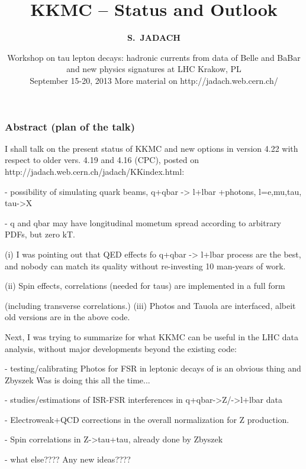 \documentclass{beamer}
\title[Monte Carlo Methods] %
{ {\bf KKMC -- Status and Outlook}
} %
\author[S.~Jadach] %
{\Large\bf S.~JADACH }
\institute[Universities of Somewhere and Elsewhere] %
{ {\large\crd IFJ-PAN, Krak\'ow, Poland}\\
  {~~~}\\
  {\footnotesize
  Partly supported by Polish Government grant\\
  {\em Narodowe Centrum Nauki} DEC-2011/03/B/ST2/02632
}}
\date[Short Occasion] %
{\small Workshop on 
tau lepton decays: hadronic currents from data of  Belle and BaBar and new physics signatures at LHC
   Krakow, PL\\
   September 15-20, 2013
\vskip 4mm
 \footnotesize
  More material on
  http://jadach.web.cern.ch/
}
\begin{document}
\begin{frame}
  \titlepage
\end{frame}



\begin{frame}[fragile]
\frametitle{Abstract (plan of the talk)}

\footnotesize
I shall talk on the present status of KKMC and
new options in version 4.22 with respect to older vers. 4.19 and 4.16 (CPC),
posted on  http://jadach.web.cern.ch/jadach/KKindex.html:

  - possibility of simulating quark beams, q+qbar -> l+lbar +photons, l=e,mu,tau, tau->X
  
  - q and qbar may have longitudinal mometum spread according to arbitrary PDFs, but zero kT.
  
(i) I was pointing out that QED effects fo q+qbar -> l+lbar process are the best, 
 and nobody can match its quality  without re-investing 10 man-years of work.
 
(ii) Spin effects, correlations  (needed for taus) are implemented in a full form 

  (including transverse correlations.)
(iii) Photos and Tauola are interfaced, albeit old versions are in the above code.

Next, I was trying to summarize for what KKMC can be useful in the LHC data analysis,
without major developments beyond the existing code:

- testing/calibrating Photos for FSR in leptonic decays of
  is an obvious thing and Zbyszek Was is doing this all the time...
  
- studies/estimations of ISR-FSR interferences in q+qbar->Z/->l+lbar data

- Electroweak+QCD corrections in the overall normalization for Z production.

- Spin correlations in Z->tau+tau, already done by Zbyszek

- what else???? Any new ideas????

\end{frame}
\end{document}
